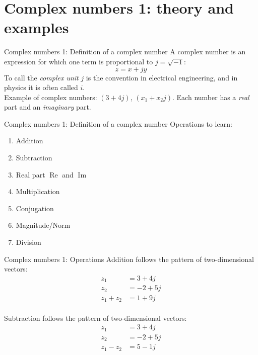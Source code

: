 \documentclass{beamer}
\begin{document}
\section{Complex numbers 1: theory and examples}

\begin{frame}{Complex numbers 1: Definition of a complex number}
A \alert{complex number} is an expression for which one term is proportional to $j = \sqrt{-1}$:
\begin{equation}
z = x + jy
\end{equation}
To call the \textit{complex unit} $j$ is the convention in electrical engineering, and in physics it is often called $i$. \\ \vspace{0.5cm}
Example of complex numbers: $(3+4j)$, $(x_1 + x_2 j)$.  Each number has a \textit{real} part and an \textit{imaginary} part.
\end{frame}

\begin{frame}{Complex numbers 1: Definition of a complex number}
Operations to learn:
\begin{enumerate}
\item Addition
\item Subtraction
\item Real part $\operatorname{Re}$ and $\operatorname{Im}$
\item Multiplication
\item Conjugation
\item Magnitude/Norm
\item Division
\end{enumerate}
\end{frame}

\begin{frame}{Complex numbers 1: Operations}
Addition follows the pattern of two-dimensional vectors:
\begin{align}
z_1 &= 3+4j \\
z_2 &= -2+5j \\
z_1 + z_2 &= 1+9j
\end{align} \\
Subtraction follows the pattern of two-dimensional vectors:
\begin{align}
z_1 &= 3+4j \\
z_2 &= -2+5j \\
z_1 - z_2 &= 5-1j
\end{align}
\end{frame}
\end{document}
